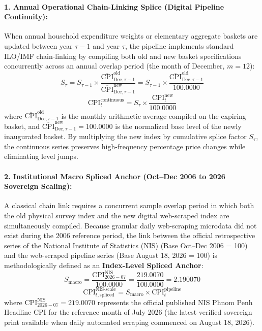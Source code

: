 \paragraph{1. Annual Operational Chain-Linking Splice (Digital Pipeline Continuity):}
\hs When annual household expenditure weights or elementary aggregate baskets are updated between year $\tau-1$ and year $\tau$, the pipeline implements standard ILO/IMF chain-linking \citep{imf2020cpi} by compiling both old and new basket specifications concurrently across an annual overlap period (the month of December, $m = 12$):
\begin{equation}
    S_\tau = S_{\tau-1} \times \frac{\overline{\text{CPI}}_{\text{Dec}, \tau-1}^{\text{old}}}{\overline{\text{CPI}}_{\text{Dec}, \tau-1}^{\text{new}}} = S_{\tau-1} \times \frac{\overline{\text{CPI}}_{\text{Dec}, \tau-1}^{\text{old}}}{100.0000}
\end{equation}
\begin{equation}
    \text{CPI}_t^{\text{continuous}} = S_\tau \times \frac{\text{CPI}_t^{\text{new}}}{100.0000}
\end{equation}
where $\overline{\text{CPI}}_{\text{Dec}, \tau-1}^{\text{old}}$ is the monthly arithmetic average compiled on the expiring basket, and $\overline{\text{CPI}}_{\text{Dec}, \tau-1}^{\text{new}} = 100.0000$ is the normalized base level of the newly inaugurated basket. By multiplying the new index by cumulative splice factor $S_\tau$, the continuous series preserves high-frequency percentage price changes while eliminating level jumps.

\paragraph{2. Institutional Macro Spliced Anchor (Oct--Dec 2006 to 2026 Sovereign Scaling):}
\hs A classical chain link requires a concurrent sample overlap period in which both the old physical survey index and the new digital web-scraped index are simultaneously compiled. Because granular daily web-scraping microdata did not exist during the 2006 reference period, the link between the official retrospective series of the National Institute of Statistics (NIS) (Base Oct--Dec 2006 = 100) and the web-scraped pipeline series (Base August 18, 2026 = 100) is methodologically defined as an \textbf{Index-Level Spliced Anchor}:
\begin{equation}
    S_{\text{macro}} = \frac{\text{CPI}_{2026-07}^{\text{NIS}}}{100.0000} = \frac{219.0070}{100.0000} = 2.190070
\end{equation}
\begin{equation}
    \text{CPI}_{t, \text{spliced}}^{\text{NIS-scale}} = S_{\text{macro}} \times \text{CPI}_t^{\text{pipeline}}
\end{equation}
where $\text{CPI}_{2026-07}^{\text{NIS}} = 219.0070$ represents the official published NIS Phnom Penh Headline CPI for the reference month of July 2026 (the latest verified sovereign print available when daily automated scraping commenced on August 18, 2026). 

